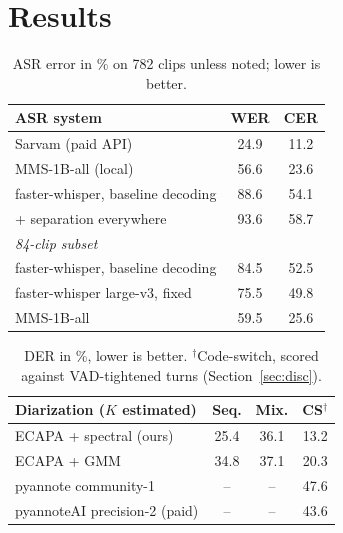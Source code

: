 \documentclass[11pt,a4paper,twocolumn]{article}
\begin{document}
\section{Results}
\begin{table}[h]
\centering
\small
\begin{tabular}{lcc}
\toprule
ASR system & WER & CER \\
\midrule
Sarvam (paid API) & 24.9 & 11.2 \\
MMS-1B-all (local) & 56.6 & 23.6 \\
faster-whisper, baseline decoding & 88.6 & 54.1 \\
\quad + separation everywhere & 93.6 & 58.7 \\
\midrule
\multicolumn{3}{l}{\emph{84-clip subset}} \\
faster-whisper, baseline decoding & 84.5 & 52.5 \\
faster-whisper large-v3, fixed & 75.5 & 49.8 \\
MMS-1B-all & 59.5 & 25.6 \\
\bottomrule
\end{tabular}
\caption{ASR error in \% on 782 clips unless noted; lower is better.}
\label{tab:asr}
\end{table}

\begin{table}[h]
\centering
\small
\begin{tabular}{lccc}
\toprule
Diarization ($K$ estimated) & Seq. & Mix. & CS$^\dagger$ \\
\midrule
ECAPA + spectral (ours) & 25.4 & 36.1 & 13.2 \\
ECAPA + GMM & 34.8 & 37.1 & 20.3 \\
pyannote community-1 & -- & -- & 47.6 \\
pyannoteAI precision-2 (paid) & -- & -- & 43.6 \\
\bottomrule
\end{tabular}
\caption{DER in \%, lower is better. $^\dagger$Code-switch, scored against VAD-tightened turns
(Section~\ref{sec:disc}).}
\label{tab:diar}
\end{table}
\end{document}
